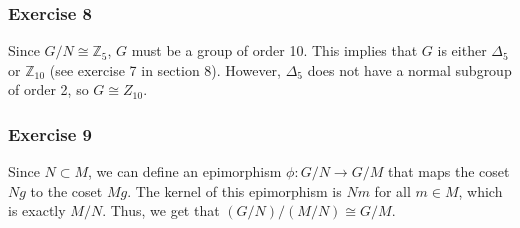 \subsubsection{Exercise 8}
Since $G/N \cong \mathbb{Z}_5$, $G$ must be a group of order 10. This implies that  $G$ is either  $\Delta_5$
or $\mathbb{Z}_10$ (see exercise 7 in section 8). However, $\Delta_5$ does not have a normal subgroup
of order 2, so $G \cong Z_{10}$.

\subsubsection{Exercise 9}
Since $N \subset M$, we can define an epimorphism $\phi: G / N \to G / M$ that maps the coset $Ng$ to the
coset  $Mg$. The kernel of this epimorphism is $Nm$ for all $m \in M$, which is exactly $M / N$. Thus,
we get that  $(G / N) / (M / N) \cong G / M$.
